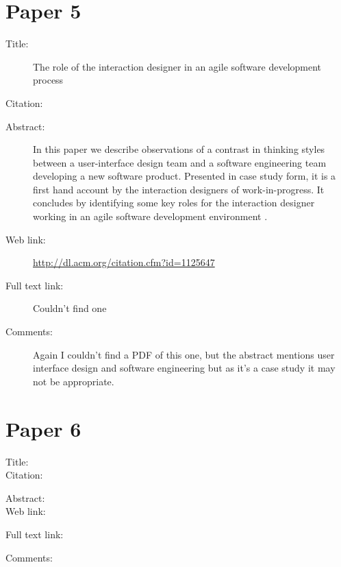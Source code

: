 \documentclass{scrartcl}
\begin{document}
\section*{Paper 5}
\begin{description}
	\item[Title:] The role of the interaction designer in an agile software development process
	\item[Citation:] \cite{Lievesley}
	\item[Abstract:] In this paper we describe observations of a contrast in thinking styles between a user-interface design team and a software engineering team developing a new software product. Presented in case study form, it is a first hand account by the interaction designers of work-in-progress. It concludes by identifying some key roles for the interaction designer working in an agile software development environment .
	\item[Web link:] \url{http://dl.acm.org/citation.cfm?id=1125647}
	\item[Full text link:] Couldn't find one
	\item[Comments:]  Again I couldn't find a PDF of this one, but the abstract mentions user interface design and software engineering but as it's a case study it may not be appropriate.
\end{description}


\section*{Paper 6}
\begin{description}
	\item[Title:] 
	\item[Citation:] \cite{}
	\item[Abstract:] 
	\item[Web link:] \url{}
	\item[Full text link:] \url{}
	\item[Comments:]  
\end{description}




\end{document}
